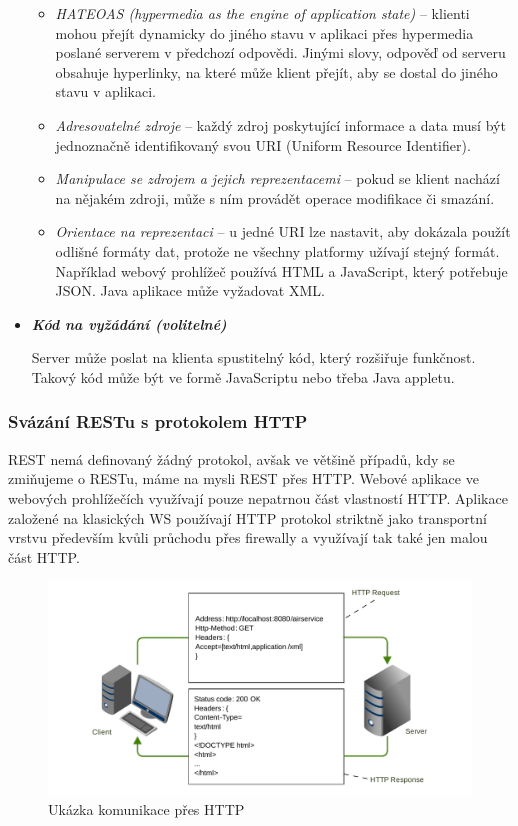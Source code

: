 \documentclass[11pt,twoside,a4paper]{book}
\begin{document}
\begin{itemize}
	\begin{itemize}
 	 \item \textit{HATEOAS (hypermedia as the engine of application state)} –
 	 klienti mohou přejít dynamicky do jiného stavu v aplikaci přes hypermedia poslané serverem v předchozí odpovědi. Jinými slovy, odpověď od serveru obsahuje hyperlinky, na které může klient
přejít, aby se dostal do jiného stavu v aplikaci.
	  \item \textit{Adresovatelné zdroje} – každý zdroj
	  poskytující informace a data musí být jednoznačně identifikovaný svou URI (Uniform Resource Identifier).
		\item \textit{Manipulace se zdrojem a jejich reprezentacemi} – pokud se klient nachází na nějakém zdroji, může s ním provádět operace modifikace či smazání.
		\item \textit{Orientace na reprezentaci} – u jedné
		URI lze nastavit, aby dokázala použít odlišné formáty dat, protože ne všechny platformy užívají stejný formát. Například webový
prohlížeč používá HTML a JavaScript, který potřebuje JSON. Java aplikace může
vyžadovat XML.
	\end{itemize}

\item\textbf{\textit{Kód na vyžádání (volitelné)}}

Server může poslat na klienta spustitelný kód, který rozšiřuje funkčnost. Takový kód může
být ve formě JavaScriptu nebo třeba Java appletu.
\end{itemize}

\subsubsection{Svázání RESTu s protokolem HTTP}

REST nemá definovaný žádný protokol, avšak ve většině případů, kdy se zmiňujeme o
RESTu, máme na mysli REST přes HTTP. Webové aplikace ve webových prohlížečích 
využívají pouze nepatrnou část vlastností HTTP. Aplikace založené na klasických WS
používají HTTP protokol striktně jako transportní vrstvu především kvůli průchodu přes
firewally a využívají tak také jen malou část HTTP.

\begin{figure}[h]
\begin{center}
\includegraphics[width=13cm]{images-pdf/http.pdf}
\caption{Ukázka komunikace přes HTTP}
\label{fig:logo}
\end{center}
\end{figure}
\end{document}
